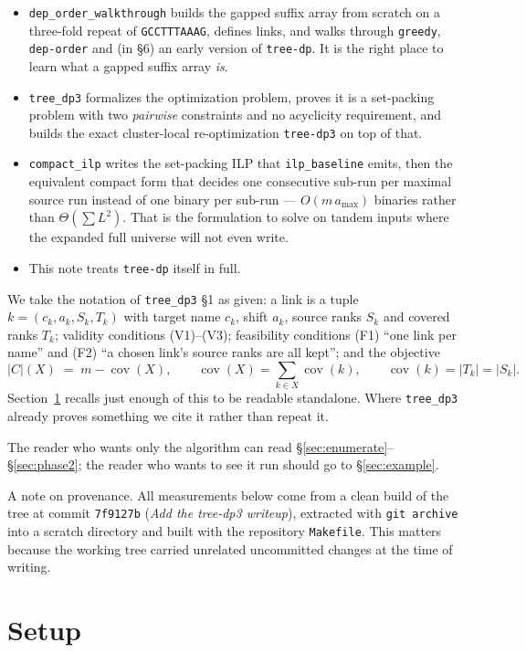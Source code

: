 \documentclass[11pt,a4paper]{article}
\theoremstyle{definition}
\theoremstyle{plain}
\theoremstyle{remark}
\newcommand{\cov}{\operatorname{cov}}
\begin{document}
\begin{itemize}
\item \texttt{dep\_order\_walkthrough} builds the gapped suffix array
  from scratch on a three-fold repeat of \texttt{GCCTTTAAAG}, defines
  links, and walks through \texttt{greedy}, \texttt{dep-order} and
  (in \S6) an early version of \texttt{tree-dp}. It is the right place
  to learn what a gapped suffix array \emph{is}.
\item \texttt{tree\_dp3} formalizes the optimization problem, proves it
  is a set-packing problem with two \emph{pairwise} constraints and no
  acyclicity requirement, and builds the exact cluster-local
  re-optimization \texttt{tree-dp3} on top of that.
\item \texttt{compact\_ilp} writes the set-packing ILP that
  \texttt{ilp\_baseline} emits, then the equivalent compact form that
  decides one consecutive sub-run per maximal source run instead of one
  binary per sub-run --- $O(m\,a_{\max})$ binaries rather than
  $\Theta(\sum L^2)$. That is the formulation to solve on tandem inputs
  where the expanded full universe will not even write.
\item This note treats \texttt{tree-dp} itself in full.
\end{itemize}

We take the notation of \texttt{tree\_dp3} \S1 as given: a link is a
tuple $k = (c_k, a_k, S_k, T_k)$ with target name $c_k$, shift $a_k$,
source ranks $S_k$ and covered ranks $T_k$; validity conditions
(V1)--(V3); feasibility conditions (F1) ``one link per name'' and (F2)
``a chosen link's source ranks are all kept''; and the objective
\[
  |C|(X) \;=\; m - \cov(X),
  \qquad
  \cov(X) = \sum_{k \in X} \cov(k),
  \qquad
  \cov(k) = |T_k| = |S_k|.
\]
Section~\ref{sec:setup} recalls just enough of this to be readable
standalone. Where \texttt{tree\_dp3} already proves something we cite it
rather than repeat it.

The reader who wants only the algorithm can read
\S\ref{sec:enumerate}--\S\ref{sec:phase2}; the reader who wants to see
it run should go to \S\ref{sec:example}.

A note on provenance. All measurements below come from a clean build of
the tree at commit \texttt{7f9127b} (\emph{Add the tree-dp3 writeup}),
extracted with \texttt{git archive} into a scratch directory and built
with the repository \texttt{Makefile}. This matters because the working
tree carried unrelated uncommitted changes at the time of writing.

\section{Setup}
\label{sec:setup}
\end{document}
